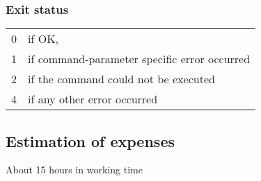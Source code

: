 \documentclass{article} %
\begin{document}
		\subsubsection*{Exit status}
		\begin{tabular}{ll}
			0 &  if OK,\\ 
			1 &  if command-parameter specific error occurred\\
			2 &  if the command could not be executed\\
			4 &  if any other error occurred\\
		\end{tabular}
		\subsection{Estimation of expenses}
		About 15 hours in working time
		\newpage
\end{document}

